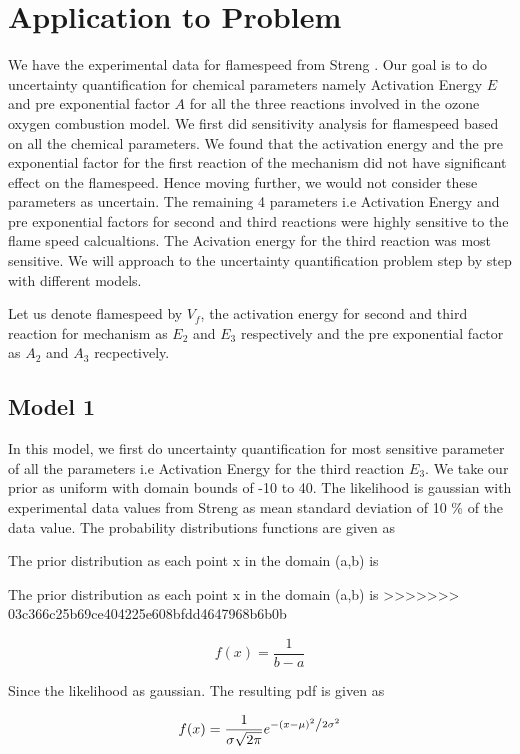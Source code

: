 \section{Application to Problem}

\noindent We have the experimental data for flamespeed from Streng \cite{Streng}. Our goal is to do uncertainty quantification for chemical parameters namely Activation Energy $ E $ and pre exponential factor $ A $ for all the three reactions involved in the ozone oxygen combustion model. We first did sensitivity analysis for flamespeed based on all the chemical parameters. We found that the activation energy and the pre exponential factor for the first reaction of the mechanism did not have significant effect on the flamespeed. Hence moving further, we would not consider these parameters as uncertain. The remaining 4 parameters i.e Activation Energy and pre exponential factors for second and third reactions were highly sensitive to the flame speed calcualtions. The Acivation energy for the third reaction was most sensitive. We will approach to the uncertainty quantification problem step by step with different models.  

\noindent Let us denote flamespeed by $V_f$, the activation energy for second and third reaction for mechanism as $E_2$ and $E_3$ respectively and the pre exponential factor as $A_2$ and $A_3$ recpectively. 


\subsection{Model 1}
\noindent In this model, we first do uncertainty quantification for most sensitive parameter of all the parameters i.e Activation Energy for the third reaction $E_3$. We take our prior as uniform with domain bounds of -10 to 40. The likelihood is gaussian with experimental data values from Streng\cite{Streng} as mean standard deviation of 10 \% of the data value. The probability distributions functions are given as


\noindent The prior distribution as each point x in the domain (a,b) is 

\noindent The prior distribution as each point x in the domain (a,b) is 
>>>>>>> 03c366c25b69ce404225e608bfdd4647968b6b0b

$$f(x) = \frac{1}{b -a}$$


\noindent Since the likelihood as gaussian. The resulting pdf is given as 

$$f(x) = \frac{1}{{\sigma \sqrt {2\pi } }}e^{{{ - \left( {x - \mu } \right)^2 } \mathord{\left/ {\vphantom {{ - \left( {x - \mu } \right)^2 } {2\sigma ^2 }}} \right. \kern-\nulldelimiterspace} {2\sigma ^2 }}} $$


